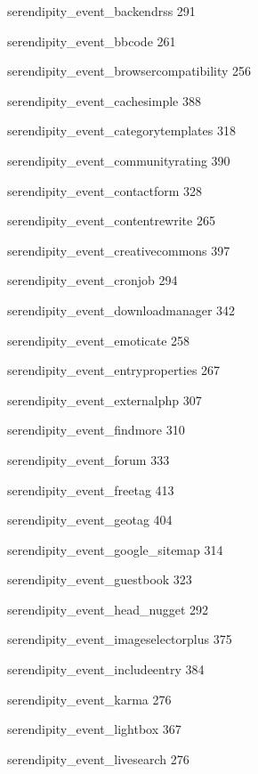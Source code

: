 \documentclass{book}
\renewcommand\subitem{\par}
\begin{document}
\begin{multicols}{2}
\begin{osp-index}
    \subitem serendipity\_event\_backendrss\hspace{1mm} 291
    \subitem serendipity\_event\_bbcode\hspace{1mm} 261
    \subitem serendipity\_event\_browsercompatibility\hspace{1mm} 256
    \subitem serendipity\_event\_cachesimple\hspace{1mm} 388
    \subitem serendipity\_event\_categorytemplates\hspace{1mm} 318
    \subitem serendipity\_event\_communityrating\hspace{1mm} 390
    \subitem serendipity\_event\_contactform\hspace{1mm} 328
    \subitem serendipity\_event\_contentrewrite\hspace{1mm} 265
    \subitem serendipity\_event\_creativecommons\hspace{1mm} 397
    \subitem serendipity\_event\_cronjob\hspace{1mm} 294
    \subitem serendipity\_event\_downloadmanager\hspace{1mm} 342
    \subitem serendipity\_event\_emoticate\hspace{1mm} 258
    \subitem serendipity\_event\_entryproperties\hspace{1mm} 267
    \subitem serendipity\_event\_externalphp\hspace{1mm} 307
    \subitem serendipity\_event\_findmore\hspace{1mm} 310
    \subitem serendipity\_event\_forum\hspace{1mm} 333
    \subitem serendipity\_event\_freetag\hspace{1mm} 413
    \subitem serendipity\_event\_geotag\hspace{1mm} 404
    \subitem serendipity\_event\_google\_sitemap\hspace{1mm} 314
    \subitem serendipity\_event\_guestbook\hspace{1mm} 323
    \subitem serendipity\_event\_head\_nugget\hspace{1mm} 292
    \subitem serendipity\_event\_imageselectorplus\hspace{1mm} 375
    \subitem serendipity\_event\_includeentry\hspace{1mm} 384
    \subitem serendipity\_event\_karma\hspace{1mm} 276
    \subitem serendipity\_event\_lightbox\hspace{1mm} 367
    \subitem serendipity\_event\_livesearch\hspace{1mm} 276

\end{osp-index}
\end{multicols}
\end{document}
